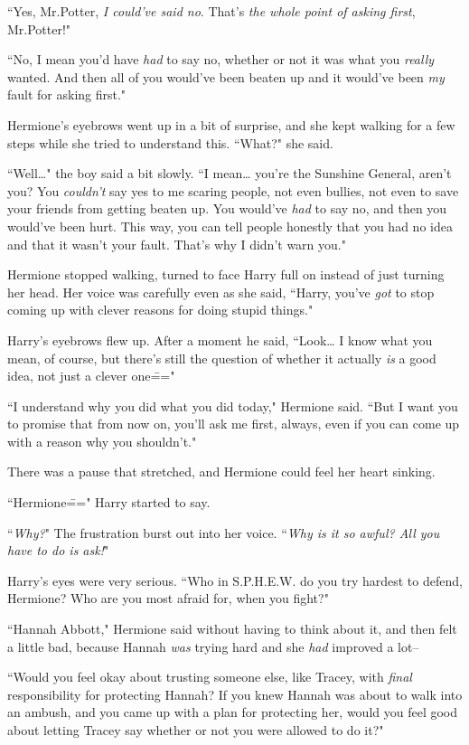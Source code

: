 ``Yes, Mr.\?Potter, \emph{I could've said no}. That's \emph{the whole point of asking first}, Mr.\?Potter!"

``No, I mean you'd have \emph{had} to say no, whether or not it was what you \emph{really} wanted. And then all of you would've been beaten up and it would've been \emph{my} fault for asking first."

Hermione's eyebrows went up in a bit of surprise, and she kept walking for a few steps while she tried to understand this. ``What?" she said.

``Well{\ldots}" the boy said a bit slowly. ``I mean{\ldots} you're the Sunshine General, aren't you? You \emph{couldn't} say yes to me scaring people, not even bullies, not even to save your friends from getting beaten up. You would've \emph{had} to say no, and then you would've been hurt. This way, you can tell people honestly that you had no idea and that it wasn't your fault. That's why I didn't warn you."

Hermione stopped walking, turned to face Harry full on instead of just turning her head. Her voice was carefully even as she said, ``Harry, you've \emph{got} to stop coming up with clever reasons for doing stupid things."

Harry's eyebrows flew up. After a moment he said, ``Look{\ldots} I know what you mean, of course, but there's still the question of whether it actually \emph{is} a good idea, not just a clever one\==="

``I understand why you did what you did today," Hermione said. ``But I want you to promise that from now on, you'll ask me first, always, even if you can come up with a reason why you shouldn't."

There was a pause that stretched, and Hermione could feel her heart sinking.

``Hermione\===" Harry started to say.

``\emph{Why?}" The frustration burst out into her voice. ``\emph{Why is it so awful? All you have to do is ask!}"

Harry's eyes were very serious. ``Who in S.P.H.E.W. do you try hardest to defend, Hermione? Who are you most afraid for, when you fight?"

``Hannah Abbott," Hermione said without having to think about it, and then felt a little bad, because Hannah \emph{was} trying hard and she \emph{had} improved a lot\---

``Would you feel okay about trusting someone else, like Tracey, with \emph{final} responsibility for protecting Hannah? If you knew Hannah was about to walk into an ambush, and you came up with a plan for protecting her, would you feel good about letting Tracey say whether or not you were allowed to do it?"

